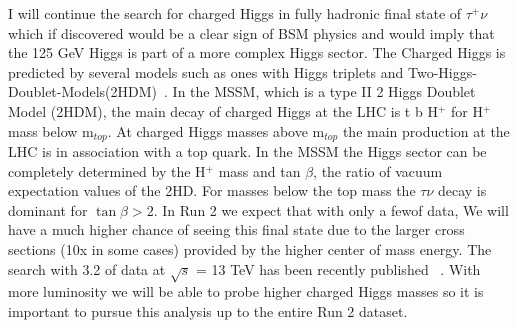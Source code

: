 I will continue the search for charged Higgs in fully hadronic final state of $\tau^+ \nu$ which if discovered would be a clear sign of BSM physics 
and would imply that the 125 GeV Higgs is part of a more complex Higgs sector. 
The Charged Higgs is predicted by several models such as ones with Higgs triplets and Two-Higgs-Doublet-Models(2HDM)~\cite{2hdm1,2hdm2,2hdm3}. 
In the MSSM, which is a type II 2 Higgs Doublet Model (2HDM), the main decay of charged Higgs at the LHC is t \too b H$^+$ for H$^+$ mass below m$_{top}$. At charged Higgs masses above m$_{top}$
the main production at the LHC is in association with a top quark.  In the MSSM the Higgs sector can be completely determined by the H$^+$ mass and tan $\beta$, the ratio of vacuum expectation values of the 2HD.
For masses below the top mass the $\tau \nu$ decay is dominant for $\tan \beta >2 $. In Run 2 we expect that with only a few\invfb of data,
We will have a much higher chance of seeing this final state due to the larger cross sections (10x in some cases) provided by the higher center of mass energy. The search with 3.2 \invfb of data at $\sqrt s$ = 13 TeV has been recently published ~\cite{taunu}.
With more luminosity we will be able to probe higher charged Higgs masses so it is important to pursue this analysis up to the entire Run 2 dataset.

